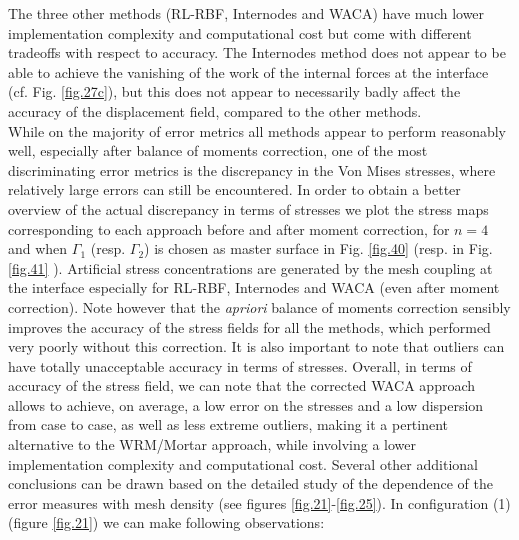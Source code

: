  The three other methods (RL-RBF, Internodes and WACA) have much lower implementation complexity and computational cost but come with different tradeoffs with respect to accuracy. The Internodes method does not appear to be able to achieve the vanishing of the work of the internal forces at the interface (cf. Fig. \ref{fig.27c}), but this does not appear to necessarily badly affect the accuracy of the displacement field, compared to the other methods.
 \\
 While on the majority of error metrics all methods appear to perform reasonably well, especially after balance of moments correction, one of the most discriminating error metrics is the discrepancy in the Von Mises stresses, where relatively large errors can still be encountered. In order to obtain a better overview of the actual discrepancy in terms of stresses we plot the stress maps corresponding to each approach before and after moment correction, for $n=4$ and when $\Gamma_1$ (resp. $\Gamma_2$) is chosen as master surface in Fig. \ref{fig.40} (resp. in Fig.\ref{fig.41} ). Artificial stress concentrations are generated by the mesh coupling at the interface especially for RL-RBF, Internodes and WACA (even after moment correction). Note however that the \textit{apriori} balance of moments correction sensibly improves the accuracy of the stress fields for all the methods, which performed very poorly without this correction. It is also important to note that outliers can have totally unacceptable accuracy in terms of stresses. Overall, in terms of accuracy of the stress field, we can note that the corrected WACA approach allows to achieve, on average, a low error on the stresses and a low dispersion from case to case, as well as less extreme outliers, making it a pertinent alternative to the WRM/Mortar approach, while involving a lower implementation complexity and computational cost. Several other additional conclusions can be drawn based on the detailed study of the dependence of the error measures with mesh density (see figures \ref{fig.21}-\ref{fig.25}). In configuration (1)(figure \ref{fig.21}) we can make following observations:
